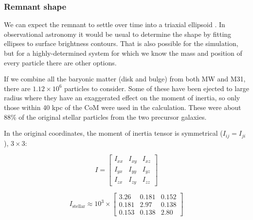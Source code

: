 \documentclass[twocolumn]{aastex63}
\newcommand{\todo}{\color{red}{TODO}\color{black}\hspace{2mm}}
\begin{document}

\subsubsection{Remnant shape}

\todo{boxiness?}

We can expect the remnant to settle over time into a triaxial ellipsoid \todo{ref?}. In observational astronomy it would be usual to determine the shape by fitting ellipses to surface brightness contours. That is also possible for the simulation, but for a highly-determined system for which we know the mass and position of every particle there are other options.

If we combine all the baryonic matter (disk and bulge) from both MW and M31, there are $1.12 \times 10^6$ particles to consider. Some of these have been ejected to large radius where they have an exaggerated effect on the moment of inertia, so only those within 40 kpc of the CoM were used in the calculation. These were about 88\% of the original stellar particles from the two precursor galaxies.

In the original coordinates, the moment of inertia tensor is symmetrical ($I_{ij} = I_{ji}$), $3 \times 3$:

\[ I = \begin{bmatrix}
			I_{xx} & I_{xy} & I_{xz}\\
			I_{yx} & I_{yy} & I_{yz}\\
			I_{zx} & I_{zy} & I_{zz} 
		\end{bmatrix} \]
		
\[  I_{\text{stellar}} \approx 10^3 \times \begin{bmatrix}
		3.26 & 0.181 & 0.152\\
		0.181 & 2.97 & 0.138\\
		0.153 & 0.138 & 2.80
	\end{bmatrix} \] %
		
\end{document}
